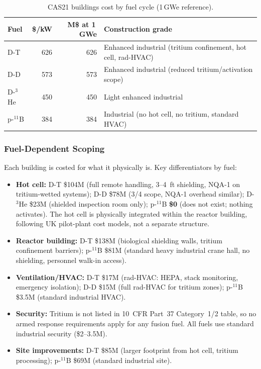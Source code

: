 \documentclass{article}
\begin{document}
\begin{table}[htbp]
\caption{CAS21 buildings cost by fuel cycle (1\,GWe reference).}
\label{tab:cas21-fuel}
\centering
\begin{tabular}{lrrl}
\toprule
Fuel & \$/kW & M\$ at 1\,GWe & Construction grade \\
\midrule
D-T    & 626 & 626 & Enhanced industrial (tritium confinement, hot cell, rad-HVAC) \\
D-D    & 573 & 573 & Enhanced industrial (reduced tritium/activation scope) \\
D-${}^3$He & 450 & 450 & Light enhanced industrial \\
p-${}^{11}$B & 384 & 384 & Industrial (no hot cell, no tritium, standard HVAC) \\
\bottomrule
\end{tabular}
\end{table}

\subsubsection{Fuel-Dependent Scoping}
Each building is costed for what it physically is.  Key
differentiators by fuel:

\begin{itemize}
\item \textbf{Hot cell:} D-T \$104M (full remote handling, 3--4~ft
  shielding, NQA-1 on tritium-wetted systems); D-D \$78M (3/4 scope,
  NQA-1 overhead similar); D-${}^3$He \$23M (shielded inspection room
  only); p-${}^{11}$B \textbf{\$0} (does not exist; nothing
  activates).  The hot cell is physically integrated within the
  reactor building, following UK pilot-plant cost models, not a separate
  structure.

\item \textbf{Reactor building:} D-T \$138M (biological shielding
  walls, tritium confinement barriers); p-${}^{11}$B \$81M (standard
  heavy industrial crane hall, no shielding, personnel walk-in access).

\item \textbf{Ventilation/HVAC:} D-T \$17M (rad-HVAC: HEPA, stack
  monitoring, emergency isolation); D-D \$15M (full rad-HVAC for
  tritium zones); p-${}^{11}$B \$3.5M (standard industrial HVAC).

\item \textbf{Security:} Tritium is not listed in 10~CFR Part~37
  Category~1/2 table, so no armed response requirements apply for any fusion
  fuel.  All fuels use standard industrial security (\$2--3.5M).

\item \textbf{Site improvements:} D-T \$85M (larger footprint from
  hot cell, tritium processing); p-${}^{11}$B \$69M (standard industrial site).
\end{itemize}
\end{document}
